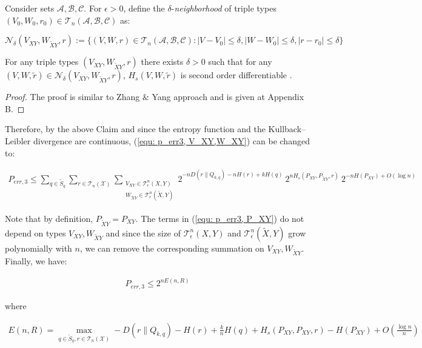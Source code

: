 \begin{definition}
Consider sets $\mathcal{A,B,C}$. For $\epsilon>0$, define the $\delta$-\textit{neighborhood} of triple types $(V_0,W_0,r_0)\in \mathcal{T}_n(\mathcal{A,B,C})$ as:
\end{definition}


\begin{equation*}
\mathcal{N}_\delta(V_{XY},W_{\tilde{X}Y},r):=\Big\{ (V,W,r)\in \mathcal{T}_n(\mathcal{A,B,C}): |V-V_0|\leq \delta, |W-W_0|\leq \delta, |r-r_0|\leq \delta \Big \}
\end{equation*}
\begin{claim}\label{claim: H_s}
For any triple types $(V_{XY},W_{\tilde{X}Y},r)$ there exists $\delta >0$ such that for any $(V,W,\tilde{r}) \in \mathcal{N}_\delta(V_{XY},W_{\tilde{X}Y},r)$,  $H_s(V,W,\tilde{r})$ is second order differentiable .  
\end{claim}


\begin{proof}
The proof is similar to Zhang $\&$ Yang approach and is given at Appendix B.
\end{proof}


Therefore, by the above Claim and since the entropy function and the Kullback–Leibler divergence are continuous, (\ref{equ: p_err3, V_XY,W_XY}) can be changed to:

\begin{align} \label{equ: p_err3, P_XY}
P_{err,3}\leq \sum_{q\in \tilde{S}_q}\sum_{r\in\mathcal{T}_n(\mathcal{X}) } \sum_{\substack{V_{XY}\in \mathcal{T}_\epsilon^n(X,Y)\\ W_{\tilde{X}Y}\in  \mathcal{T}_\epsilon^n(\tilde{X},Y) }} 2^{-nD(r\| Q_{k,q})-nH(r)+kH(q)} ~2^{nH_s(P_{XY},P_{\tilde{X}Y},r)}~ 2^{-nH(P_{XY})+O(\log n)}
\end{align}

Note that by definition, $P_{\tilde{X}Y}=P_{XY}$. The terms in (\ref{equ: p_err3, P_XY}) do not depend on types $V_{XY},W_{\tilde{X}Y} $ and since the size of $\mathcal{T}_\epsilon^n(X,Y)$ and $\mathcal{T}_\epsilon^n(\tilde{X},Y) $ grow polynomially with $n$, we can remove the corresponding summation on $V_{XY},W_{\tilde{X}Y} $. Finally, we have:

\begin{align*}
P_{err,3}\leq 2^{nE(n,R)}
\end{align*}

where

\begin{align*}
E(n,R)= \max_{q\in \tilde{S}_q, r\in\mathcal{T}_n(\mathcal{X})} -D(r\| Q_{k,q})-H(r)+\frac{k}{n} H(q)+H_s(P_{XY},P_{XY},r)-H(P_{XY})+O(\frac{\log n}{n})
\end{align*}



